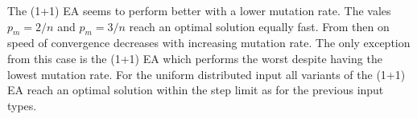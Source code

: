 The (1+1) EA seems to perform better with a lower mutation rate.
The vales $p_m=2/n$ and $p_m=3/n$ reach an optimal solution equally fast.
From then on speed of convergence decreases with increasing mutation rate.
The only exception from this case is the (1+1) EA which performs the worst despite having the lowest mutation rate.
For the uniform distributed input all variants of the (1+1) EA reach an optimal solution within the step limit as for the previous input types.